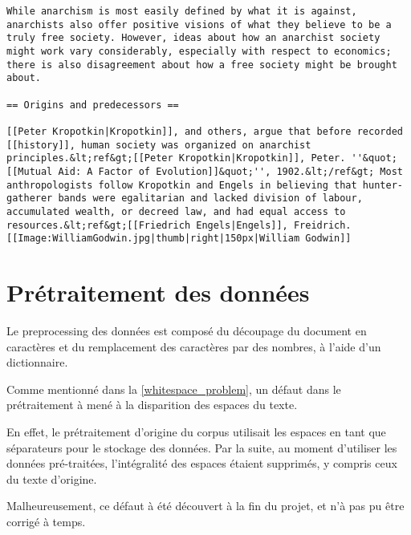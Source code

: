 \begin{lstlisting}[caption={Extrait des premières lignes du fichier enwik8, correspondant à l'article Wikipédia sur l'ansarchisme.},label=enwik8_ex]
While anarchism is most easily defined by what it is against, anarchists also offer positive visions of what they believe to be a truly free society. However, ideas about how an anarchist society might work vary considerably, especially with respect to economics; there is also disagreement about how a free society might be brought about. 

== Origins and predecessors ==

[[Peter Kropotkin|Kropotkin]], and others, argue that before recorded [[history]], human society was organized on anarchist principles.&lt;ref&gt;[[Peter Kropotkin|Kropotkin]], Peter. ''&quot;[[Mutual Aid: A Factor of Evolution]]&quot;'', 1902.&lt;/ref&gt; Most anthropologists follow Kropotkin and Engels in believing that hunter-gatherer bands were egalitarian and lacked division of labour, accumulated wealth, or decreed law, and had equal access to resources.&lt;ref&gt;[[Friedrich Engels|Engels]], Freidrich.
[[Image:WilliamGodwin.jpg|thumb|right|150px|William Godwin]]
\end{lstlisting}

\section{Prétraitement des données}
Le \gls{preprocessing} des données est composé du découpage du document en caractères et du remplacement des caractères par des nombres, à l'aide d'un dictionnaire.

Comme mentionné dans la \autoref{whitespace_problem}, un défaut dans le prétraitement à mené à la disparition des espaces du texte.

En effet, le prétraitement d'origine du corpus utilisait les espaces en tant que séparateurs pour le stockage des données. Par la suite, au moment d'utiliser les données pré-traitées, l'intégralité des espaces étaient supprimés, y compris ceux du texte d'origine.

Malheureusement, ce défaut à été découvert à la fin du projet, et n'à pas pu être corrigé à temps.
